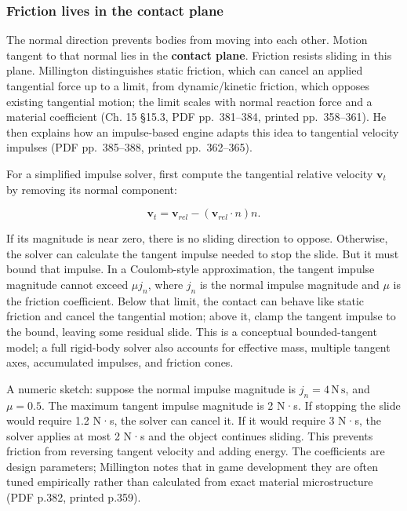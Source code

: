 \subsubsection{Friction lives in the contact plane}\label{06-engine-ii-ch033-friction-lives-in-the-contact-plane}

The normal direction prevents bodies from moving into each other. Motion tangent to that normal lies in the \textbf{contact plane}. Friction resists sliding in this plane. Millington distinguishes static friction, which can cancel an applied tangential force up to a limit, from dynamic/kinetic friction, which opposes existing tangential motion; the limit scales with normal reaction force and a material coefficient (Ch. 15 §15.3, PDF pp.~381--384, printed pp.~358--361). He then explains how an impulse-based engine adapts this idea to tangential velocity impulses (PDF pp.~385--388, printed pp.~362--365).

For a simplified impulse solver, first compute the tangential relative velocity \(\mathbf{v}_t\) by removing its normal component:

\[
\mathbf{v}_t=\mathbf{v}_{rel}-(\mathbf{v}_{rel}\cdot n)n.
\]

If its magnitude is near zero, there is no sliding direction to oppose. Otherwise, the solver can calculate the tangent impulse needed to stop the slide. But it must bound that impulse. In a Coulomb-style approximation, the tangent impulse magnitude cannot exceed \(\mu j_n\), where \(j_n\) is the normal impulse magnitude and \(\mu\) is the friction coefficient. Below that limit, the contact can behave like static friction and cancel the tangential motion; above it, clamp the tangent impulse to the bound, leaving some residual slide. This is a conceptual bounded-tangent model; a full rigid-body solver also accounts for effective mass, multiple tangent axes, accumulated impulses, and friction cones.

A numeric sketch: suppose the normal impulse magnitude is \(j_n=4\,\mathrm{N\,s}\), and \(\mu=0.5\). The maximum tangent impulse magnitude is 2 N·s. If stopping the slide would require 1.2 N·s, the solver can cancel it. If it would require 3 N·s, the solver applies at most 2 N·s and the object continues sliding. This prevents friction from reversing tangent velocity and adding energy. The coefficients are design parameters; Millington notes that in game development they are often tuned empirically rather than calculated from exact material microstructure (PDF p.382, printed p.359).

